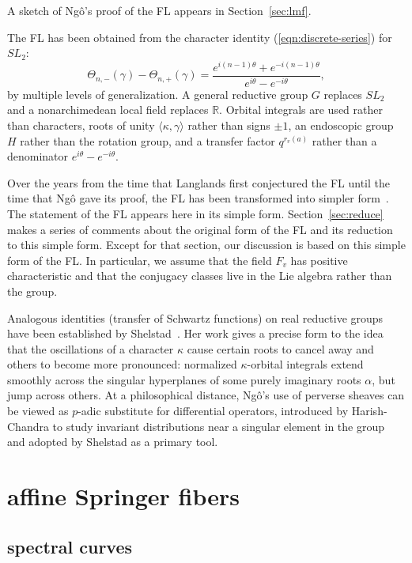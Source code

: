 \documentclass[brochure,english,12pt]{bourbaki}
\theoremstyle{plain}
\newcommand{\ring}[1]{\mathbb{#1}}
\begin{document}
A sketch of Ng\^o's proof of the FL  appears in Section~\ref{sec:lmf}. 

The FL has been obtained from the character identity
(\ref{eqn:discrete-series}) for $SL_2$:
\[
\Theta_{n,-}(\gamma) - \Theta_{n,+}(\gamma) = 
\frac{e^{i (n-1) \theta} + e^{- i (n-1) \theta}}{e^{i\theta}-e^{-i\theta}},
\]
by multiple levels of generalization.  A general reductive group $G$
replaces $SL_2$ and a nonarchimedean local field replaces $\ring{R}$.
Orbital integrals are used rather than characters, roots of unity
$\langle \kappa,\gamma\rangle$ rather than signs $\pm1$, an endoscopic
group $H$ rather than the rotation group, and a transfer factor
$q^{r_v(a)}$ rather than a denominator $e^{i\theta} - e^{-i\theta}$.

Over the years from the time that Langlands first conjectured the FL
until the time that Ng\^o gave its proof, the FL has been transformed
into simpler form~\cite{Langlands:debuts}.  The statement of the FL
appears here in its simple form.  Section~\ref{sec:reduce} makes a
series of comments about the original form of the FL and its
reduction to this simple form.  Except for that section, our
discussion is based on this simple form of the FL.  In particular, we
assume that the field $F_v$ has positive characteristic and that the
conjugacy classes live in the Lie algebra rather than the group.

Analogous identities (transfer of Schwartz functions)
on real reductive groups have been established by 
Shelstad~\cite{Shelstad:OI}.  Her work gives a precise form to the
 idea that the oscillations of a character
$\kappa$ cause certain roots to cancel away and others to become more
pronounced: normalized $\kappa$-orbital integrals extend smoothly
across the singular hyperplanes of some purely imaginary roots $\alpha$,
but jump across others.  At a philosophical distance, Ng\^o's use of
perverse sheaves can be viewed as $p$-adic substitute for 
differential operators, introduced by Harish-Chandra to study
invariant distributions near a singular element in the group and
adopted by Shelstad as a primary tool.



\section{affine Springer fibers}

\subsection{spectral curves}
\end{document}
